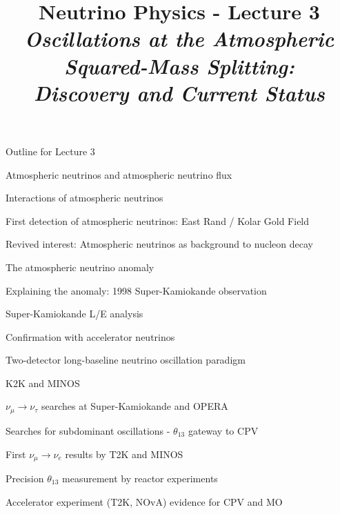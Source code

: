 \renewcommand{\thislecture}{3 }

%
%

\title[Neutrino Physics / Lecture \thislecture]
{
  {\huge \color{yellow} Neutrino Physics - Lecture \thislecture} \\
  {\it Oscillations at the Atmospheric Squared-Mass Splitting:\\Discovery and Current Status}\\
}



\begin{frame}[plain]
  \titlepage
\end{frame}

%
%

\begin{frame}{Outline for Lecture \thislecture}

\begin{itemize}
{\scriptsize
  \item Atmospheric neutrinos and atmospheric neutrino flux
  \item Interactions of atmospheric neutrinos
  \item First detection of atmospheric neutrinos: East Rand / Kolar Gold Field
  \item Revived interest: Atmospheric neutrinos as background to nucleon decay
  \item The atmospheric neutrino anomaly
  \item Explaining the anomaly: 1998 Super-Kamiokande observation
  \item Super-Kamiokande L/E analysis
  \item Confirmation with accelerator neutrinos
  \item Two-detector long-baseline neutrino oscillation paradigm
  \item K2K and MINOS
  \item $\nu_{\mu} \rightarrow \nu_{\tau}$ searches at Super-Kamiokande and OPERA
  \item Searches for subdominant oscillations - $\theta_{13}$ gateway to CPV
  \item First $\nu_{\mu} \rightarrow \nu_{e}$ results by T2K and MINOS
  \item Precision $\theta_{13}$ measurement by reactor experiments
  \item Accelerator experiment (T2K, NOvA) evidence for CPV and MO\\
}
\end{itemize}


\end{frame}

